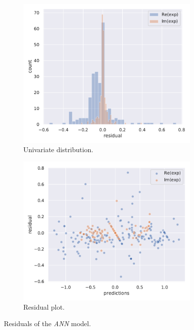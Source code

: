 \begin{figure}[htbp]
  \centering
  \begin{subfigure}{0.45\textwidth}
    \centering
    \includegraphics[width=\linewidth]{img/test_res_dist}
    \caption{Univariate distribution.}
  \end{subfigure}
  \begin{subfigure}{0.45\textwidth}
    \centering
    \includegraphics[width=\linewidth]{img/test_res_plot}
    \caption{Residual plot.}
  \end{subfigure}
  \caption{Residuals of the \emph{ANN} model.}
  \label{fig:agg:ann_res}
\end{figure}


